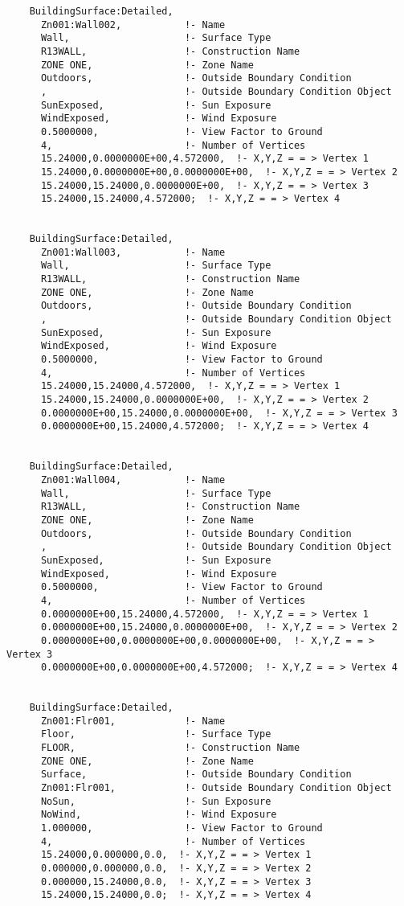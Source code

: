 \begin{lstlisting}
    BuildingSurface:Detailed,
      Zn001:Wall002,           !- Name
      Wall,                    !- Surface Type
      R13WALL,                 !- Construction Name
      ZONE ONE,                !- Zone Name
      Outdoors,                !- Outside Boundary Condition
      ,                        !- Outside Boundary Condition Object
      SunExposed,              !- Sun Exposure
      WindExposed,             !- Wind Exposure
      0.5000000,               !- View Factor to Ground
      4,                       !- Number of Vertices
      15.24000,0.0000000E+00,4.572000,  !- X,Y,Z = = > Vertex 1
      15.24000,0.0000000E+00,0.0000000E+00,  !- X,Y,Z = = > Vertex 2
      15.24000,15.24000,0.0000000E+00,  !- X,Y,Z = = > Vertex 3
      15.24000,15.24000,4.572000;  !- X,Y,Z = = > Vertex 4


    BuildingSurface:Detailed,
      Zn001:Wall003,           !- Name
      Wall,                    !- Surface Type
      R13WALL,                 !- Construction Name
      ZONE ONE,                !- Zone Name
      Outdoors,                !- Outside Boundary Condition
      ,                        !- Outside Boundary Condition Object
      SunExposed,              !- Sun Exposure
      WindExposed,             !- Wind Exposure
      0.5000000,               !- View Factor to Ground
      4,                       !- Number of Vertices
      15.24000,15.24000,4.572000,  !- X,Y,Z = = > Vertex 1
      15.24000,15.24000,0.0000000E+00,  !- X,Y,Z = = > Vertex 2
      0.0000000E+00,15.24000,0.0000000E+00,  !- X,Y,Z = = > Vertex 3
      0.0000000E+00,15.24000,4.572000;  !- X,Y,Z = = > Vertex 4


    BuildingSurface:Detailed,
      Zn001:Wall004,           !- Name
      Wall,                    !- Surface Type
      R13WALL,                 !- Construction Name
      ZONE ONE,                !- Zone Name
      Outdoors,                !- Outside Boundary Condition
      ,                        !- Outside Boundary Condition Object
      SunExposed,              !- Sun Exposure
      WindExposed,             !- Wind Exposure
      0.5000000,               !- View Factor to Ground
      4,                       !- Number of Vertices
      0.0000000E+00,15.24000,4.572000,  !- X,Y,Z = = > Vertex 1
      0.0000000E+00,15.24000,0.0000000E+00,  !- X,Y,Z = = > Vertex 2
      0.0000000E+00,0.0000000E+00,0.0000000E+00,  !- X,Y,Z = = > Vertex 3
      0.0000000E+00,0.0000000E+00,4.572000;  !- X,Y,Z = = > Vertex 4


    BuildingSurface:Detailed,
      Zn001:Flr001,            !- Name
      Floor,                   !- Surface Type
      FLOOR,                   !- Construction Name
      ZONE ONE,                !- Zone Name
      Surface,                 !- Outside Boundary Condition
      Zn001:Flr001,            !- Outside Boundary Condition Object
      NoSun,                   !- Sun Exposure
      NoWind,                  !- Wind Exposure
      1.000000,                !- View Factor to Ground
      4,                       !- Number of Vertices
      15.24000,0.000000,0.0,  !- X,Y,Z = = > Vertex 1
      0.000000,0.000000,0.0,  !- X,Y,Z = = > Vertex 2
      0.000000,15.24000,0.0,  !- X,Y,Z = = > Vertex 3
      15.24000,15.24000,0.0;  !- X,Y,Z = = > Vertex 4



\end{lstlisting}
